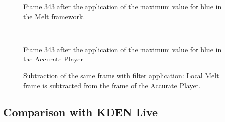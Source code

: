 \documentclass[../MasterThesis.tex]{subfiles}
\begin{document}
\begin{minipage}{0.48\textwidth}
	
	\begin{figure}[H]
		\begin{center}
			\caption[Frame 343 after the application of the blue filter in the Melt framework.]{Frame 343 after the application of the maximum value for blue in the Melt framework.}
		\end{center}
	\end{figure}
\end{minipage}\begin{minipage}{0.04\textwidth}
	\ 
\end{minipage}\begin{minipage}{0.48\textwidth}
	
	\begin{figure}[H]
		\begin{center}
			\caption[Frame 343 after the application of the blue filter in the Accurate Player.]{Frame 343 after the application of the maximum value for blue in the Accurate Player.}
		\end{center}
	\end{figure}
\end{minipage}

\vspace*{-1em}

\begin{figure}[H]
	\begin{center}
		\caption[Subtraction of the two different frames (Accurate Player - Melt).]{Subtraction of the same frame with filter application: Local Melt frame is subtracted from the frame of the Accurate Player.}
	\end{center}
\end{figure}















\subsection*{Comparison with KDEN Live}
\end{document}

